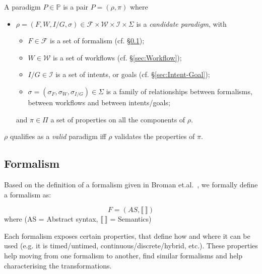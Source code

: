 \begin{definition}[Paradigm]
    A paradigm $P\in \mathbb{P}$ is a pair $P = (\rho, \pi)$ where
    \begin{itemize}
        \item $\rho = (F, W, I/G, \sigma) \in \mathcal{F}\times \mathcal{W} \times \mathcal{I} \times \Sigma$ is a \emph{candidate paradigm}, with
        \begin{itemize}
            \item $F\in\mathcal{F}$ is a set of formalism (cf. \S \ref{sec:Formalism});
            
            \item $W\in \mathcal{W}$ is a set of workflows (cf. \S \ref{sec:Workflow});
            
            \item $I/G\in \mathcal{I}$ is a set of intents, or goals (cf. \S \ref{sec:Intent-Goal});
            
            \item $\sigma =(\sigma_{F}, \sigma_{W}, \sigma_{I/G}) \in \Sigma$ is a family of relationships between formalisms, between workflows and between intents/goals;
        \end{itemize}
        and $\pi\in \Pi$ a set of properties on all the components of $\rho$. 
    \end{itemize}
    $\rho$ qualifies as a \emph{valid} paradigm iff $\rho$ validates the properties of $\pi$.
\end{definition}


\subsection{Formalism}
\label{sec:Formalism}
Based on the definition of a formalism given in Broman et.al.~\cite{BromanViewpointsformalismslanguages2012}, we formally define a formalism as:
\begin{definition}[Formalism]
    $$F = (AS, \llbracket ~ \rrbracket) $$  where (AS = Abstract syntax, $\llbracket ~ \rrbracket$ = Semantics)
\end{definition}


\begin{definition}
    Each formalism exposes certain properties, that define how and where it can be used (e.g. it is timed/untimed, continuous/discrete/hybrid, etc.).
    These properties help moving from one formalism to another, find similar formalisms and help characterising the transformations.
\end{definition}

